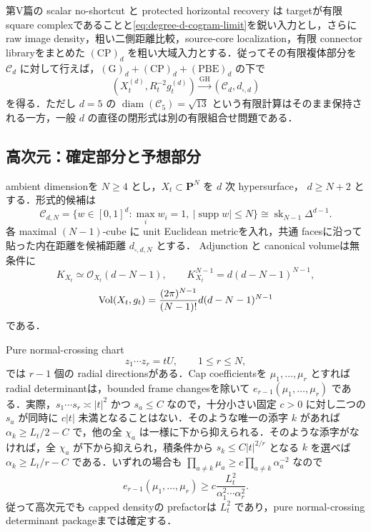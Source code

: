 \documentclass[a4paper,11pt]{ltjsarticle}
\numberwithin{equation}{section}
\theoremstyle{plain}
\theoremstyle{definition}
\theoremstyle{remark}
\newcommand{\PP}{\mathbf P}\newcommand{\CC}{\mathbf C}\newcommand{\RR}{\mathbf R}\newcommand{\ZZ}{\mathbf Z}\newcommand{\NN}{\mathbf N}
\newcommand{\supp}{\operatorname{supp}}\newcommand{\diam}{\operatorname{diam}}\newcommand{\dist}{\operatorname{dist}}
\begin{document}
第V篇の scalar no-shortcut と protected horizontal recovery は targetが有限 square complexであることと\eqref{eq:degree-d-cogram-limit}を鋭い入力とし，さらに raw image density，粗い二側距離比較，source-core localization，有限 connector libraryをまとめた $\mathrm{(CP)}_d$ を粗い大域入力とする．従ってその有限複体部分を $\mathcal C_d$ に対して行えば，$\mathrm{(G)}_d+\mathrm{(CP)}_d+\mathrm{(PBE)}_d$ の下で
\begin{equation}\label{eq:degree-d-conditional-GH}
 (X_t^{(d)},R_t^{-2}g_t^{(d)})
 \xrightarrow{\mathrm{GH}}(\mathcal C_d,d_{\square,d})
\end{equation}
を得る．ただし $d=5$ の $\diam(\mathcal C_5)=\sqrt{13}$ という有限計算はそのまま保持される一方，一般 $d$ の直径の閉形式は別の有限組合せ問題である．

\subsection{高次元：確定部分と予想部分}

ambient dimensionを $N\ge4$ とし，$X_t\subset\PP^N$ を $d$ 次 hypersurface，
$d\ge N+2$ とする．形式的候補は
\begin{equation}\label{eq:high-dimensional-candidate}
 \mathcal C_{d,N}
 =\{w\in[0,1]^d:\max_iw_i=1,\ |\supp w|\le N\}
 \cong\operatorname{sk}_{N-1}\Delta^{d-1}.
\end{equation}
各 maximal $(N-1)$-cube に unit Euclidean metricを入れ，共通 facesに沿って貼った内在距離を候補距離 $d_{\square,d,N}$ とする．
Adjunction と canonical volumeは無条件に
\begin{equation}\label{eq:high-dimensional-adjunction}
 K_{X_t}\simeq\mathcal O_{X_t}(d-N-1),
 \qquad
 K_{X_t}^{N-1}=d(d-N-1)^{N-1},
\end{equation}
\begin{equation}\label{eq:high-dimensional-volume}
 \operatorname{Vol}(X_t,g_t)
 =\frac{(2\pi)^{N-1}}{(N-1)!}
 d(d-N-1)^{N-1}
\end{equation}
である．

Pure normal-crossing chart
\[
 z_1\cdots z_r=tU,
 \qquad 1\le r\le N,
\]
では $r-1$ 個の radial directionsがある．Cap coefficientsを
$\mu_1,\ldots,\mu_r$ とすれば radial determinantは，bounded frame changesを除いて
$e_{r-1}(\mu_1,\ldots,\mu_r)$ である．実際，$s_1\cdots s_r\asymp|t|^2$ かつ $s_a\le C$ なので，十分小さい固定 $c>0$ に対し二つの $s_a$ が同時に $c|t|$ 未満となることはない．そのような唯一の添字 $k$ があれば $\alpha_k\ge L_t/2-C$ で，他の全 $\chi_a$ は一様に下から抑えられる．そのような添字がなければ，全 $\chi_a$ が下から抑えられ，積条件から $s_k\le C|t|^{2/r}$ となる $k$ を選べば $\alpha_k\ge L_t/r-C$ である．いずれの場合も
$\prod_{a\ne k}\mu_a\ge c\prod_{a\ne k}\alpha_a^{-2}$ なので
\begin{equation}\label{eq:high-dimensional-pure-NC-determinant}
 e_{r-1}(\mu_1,\ldots,\mu_r)
 \ge c\frac{L_t^2}{\alpha_1^2\cdots\alpha_r^2}.
\end{equation}
従って高次元でも capped densityの prefactorは $L_t^2$ であり，pure normal-crossing determinant packageまでは確定する．
\end{document}
